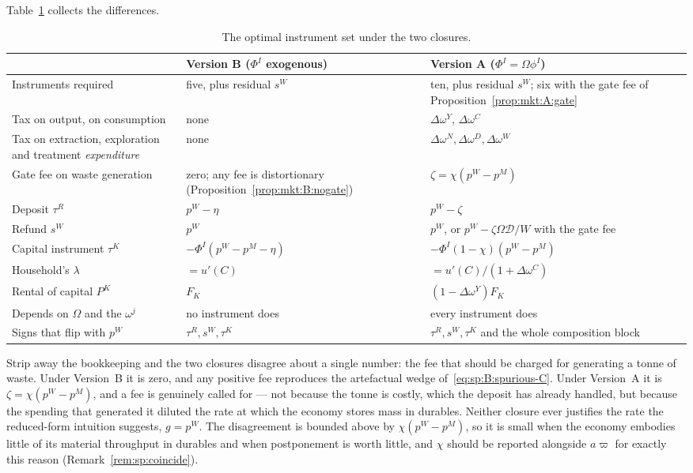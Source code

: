  Table~\ref{tab:mkt:versions} collects the differences.

\begin{table}[H]
\centering
\caption{The optimal instrument set under the two closures.}
\label{tab:mkt:versions}
\setlength{\tabcolsep}{5pt}
\renewcommand{\arraystretch}{1.05}
\begin{tabular}{@{}p{}p{}p{}@{}}
\toprule
 & Version B ($\Phi^I$ exogenous) & Version A ($\Phi^I=\Omega\phi^I$) \\
\midrule
Instruments required & five, plus residual $s^W$ & ten, plus residual $s^W$; six with
the gate fee of Proposition~\ref{prop:mkt:A:gate} \\
Tax on output, on consumption & none & $\Delta\omega^Y$, $\Delta\omega^C$ \\
Tax on extraction, exploration and treatment \emph{expenditure} & none &
$\Delta\omega^N,\Delta\omega^D,\Delta\omega^W$ \\
Gate fee on waste generation & zero; any fee is distortionary
(Proposition~\ref{prop:mkt:B:nogate}) & $\zeta=\chi\left(p^W-p^M\right)$ \\
Deposit $\tau^R$ & $p^W-\eta$ & $p^W-\zeta$ \\
Refund $s^W$ & $p^W$ & $p^W$, or $p^W-\zeta\Omega\mathcal D/W$ with the gate fee \\
Capital instrument $\tau^K$ & $-\Phi^I\left(p^W-p^M-\eta\right)$ &
$-\Phi^I\left(1-\chi\right)\left(p^W-p^M\right)$ \\
Household's $\lambda$ & $=u'(C)$ & $=u'(C)/\left(1+\Delta\omega^C\right)$ \\
Rental of capital $P^K$ & $F_K$ & $\left(1-\Delta\omega^Y\right)F_K$ \\
Depends on $\Omega$ and the $\omega^j$ & no instrument does & every instrument does \\
Signs that flip with $p^W$ & $\tau^R,s^W,\tau^K$ & $\tau^R,s^W,\tau^K$ and the whole
composition block \\
\bottomrule
\end{tabular}
\end{table}

 Strip away the bookkeeping and the two closures disagree
about a single number: the fee that should be charged for generating a tonne of waste. Under Version~B
it is zero, and any positive fee reproduces the artefactual wedge of~\eqref{eq:sp:B:spurious-C}. Under
Version~A it is $\zeta=\chi\left(p^W-p^M\right)$, and a fee is genuinely called for --- not because the
tonne is costly, which the deposit has already handled, but because the spending that generated it
diluted the rate at which the economy stores mass in durables. Neither closure ever justifies the rate
the reduced-form intuition suggests, $g=p^W$. The disagreement is bounded above by
$\chi\left(p^W-p^M\right)$, so it is small when the economy embodies little of its material throughput
in durables and when postponement is worth little, and $\chi$ should be reported alongside $a\varpi$
for exactly this reason (Remark~\ref{rem:sp:coincide}).

